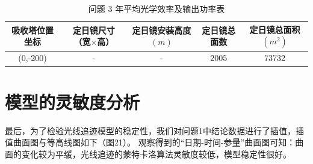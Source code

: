 \documentclass{article}
\numberwithin{equation}{subsection}
\begin{document}
\begin{table}[!htbp]
    \centering
    \begin{tabular}{|c|c|c|c|c|}\hline
        吸收塔位置坐标&\makecell[c]{定日镜尺寸\\（宽$\times$高）}&\makecell[c]{定日镜安装高度\\$(m)$}&定日镜总面数&\makecell[c]{定日镜总面积\\$(m^2)$}\\\hline
        (0,-200)&	-&	-&	2005&	73732
\\\hline
    \end{tabular}
    \caption{问题 3 年平均光学效率及输出功率表}
\end{table}
{\centering\section{模型的灵敏度分析}}
最后，为了检验光线追迹模型的稳定性，我们对问题1中结论数据进行了插值，插值曲面图与等高线图如下（图21）。
观察得到的“日期-时间-参量”曲面图可知：曲面的变化较为平缓，光线追迹的蒙特卡洛算法灵敏度较低，模型稳定性很好。 
\end{document}
